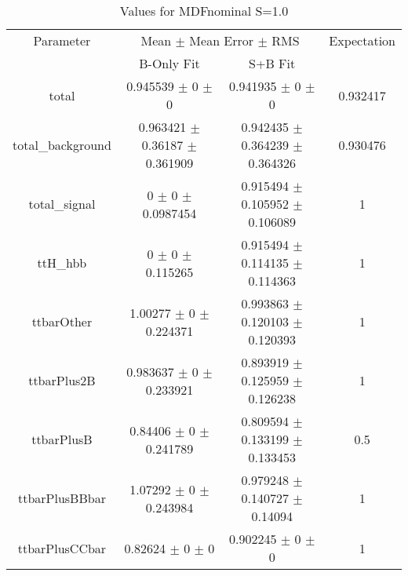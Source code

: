 \begin{table}
\centering
\caption{Values for MDFnominal S=1.0}
\begin{tabular}{cccc}
\toprule
Parameter & \multicolumn{2}{c}{Mean $\pm$ Mean Error $\pm$ RMS} & Expectation\\
 & B-Only Fit & S+B Fit & \\
\midrule
total & \num{0.945539} $\pm$ \num{0} $\pm$ \num{0} & \num{0.941935} $\pm$ \num{0} $\pm$ \num{0} & \num{0.932417}\\
total\_background & \num{0.963421} $\pm$ \num{0.36187} $\pm$ \num{0.361909} & \num{0.942435} $\pm$ \num{0.364239} $\pm$ \num{0.364326} & \num{0.930476}\\
total\_signal & \num{0} $\pm$ \num{0} $\pm$ \num{0.0987454} & \num{0.915494} $\pm$ \num{0.105952} $\pm$ \num{0.106089} & \num{1}\\
ttH\_hbb & \num{0} $\pm$ \num{0} $\pm$ \num{0.115265} & \num{0.915494} $\pm$ \num{0.114135} $\pm$ \num{0.114363} & \num{1}\\
ttbarOther & \num{1.00277} $\pm$ \num{0} $\pm$ \num{0.224371} & \num{0.993863} $\pm$ \num{0.120103} $\pm$ \num{0.120393} & \num{1}\\
ttbarPlus2B & \num{0.983637} $\pm$ \num{0} $\pm$ \num{0.233921} & \num{0.893919} $\pm$ \num{0.125959} $\pm$ \num{0.126238} & \num{1}\\
ttbarPlusB & \num{0.84406} $\pm$ \num{0} $\pm$ \num{0.241789} & \num{0.809594} $\pm$ \num{0.133199} $\pm$ \num{0.133453} & \num{0.5}\\
ttbarPlusBBbar & \num{1.07292} $\pm$ \num{0} $\pm$ \num{0.243984} & \num{0.979248} $\pm$ \num{0.140727} $\pm$ \num{0.14094} & \num{1}\\
ttbarPlusCCbar & \num{0.82624} $\pm$ \num{0} $\pm$ \num{0} & \num{0.902245} $\pm$ \num{0} $\pm$ \num{0} & \num{1}\\
\bottomrule
\end{tabular}
\end{table}